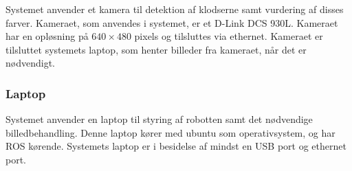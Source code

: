 Systemet anvender et kamera til detektion af klodserne samt vurdering af disses farver.
Kameraet, som anvendes i systemet, er et D-Link DCS 930L.
Kameraet har en opløsning på $640 \times 480$ pixels og tilsluttes via ethernet.
Kameraet er tilsluttet systemets laptop, som henter billeder fra kameraet, når det er nødvendigt.


\subsubsection{Laptop} %
\label{subsub:laptop}

Systemet anvender en laptop til styring af robotten samt det nødvendige billedbehandling.
Denne laptop kører med ubuntu som operativsystem, og har ROS kørende.
Systemets laptop er i besidelse af mindst en USB port og ethernet port.


